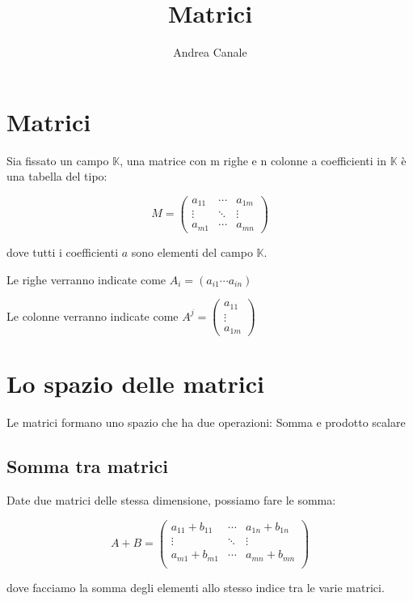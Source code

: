 \documentclass[a4paper, 10pt]{article}
\title{Matrici}
\author{Andrea Canale}
\begin{document}
	
\maketitle
\tableofcontents
\section{Matrici}

Sia fissato un campo $\mathbb{K}$, una matrice con m righe e n colonne a coefficienti in $\mathbb{K}$ è una tabella del tipo:

$$ M = \begin{pmatrix}
	a_{11} & \cdots & a_{1m} \\
	\vdots & \ddots & \vdots \\
	a_{m1} & \cdots & a_{mn} 
\end{pmatrix}  $$

dove tutti i coefficienti $a$ sono elementi del campo $\mathbb{K}$.

Le righe verranno indicate come $ A_i = (a_{i1} \cdots a_{in}) $

Le colonne verranno indicate come $ A^j = \begin{pmatrix}
	a_{11} \\
	\vdots \\
	a_{1m} 
\end{pmatrix}$

\section{Lo spazio delle matrici}

Le matrici formano uno spazio che ha due operazioni: Somma e prodotto scalare

\subsection{Somma tra matrici}

Date due matrici delle stessa dimensione, possiamo fare le somma:

$$A+B=\left(\begin{matrix}a_{11}+b_{11}&\cdots&a_{1n}+b_{1n}\\\vdots&\ddots&\vdots\\a_{m1}+b_{m1}&\cdots&a_{mn}+b_{mn}\\\end{matrix}\right) $$

dove facciamo la somma degli elementi allo stesso indice tra le varie matrici.
\end{document}
